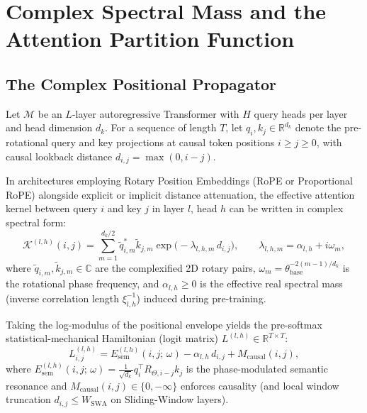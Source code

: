 \documentclass[11pt,letterpaper]{article}
\theoremstyle{definition}
\begin{document}
\tableofcontents
\vspace{1em}

\section{Complex Spectral Mass and the Attention Partition Function}

\subsection{The Complex Positional Propagator}
Let $\mathcal{M}$ be an $L$-layer autoregressive Transformer with $H$ query heads per layer and head dimension $d_k$. For a sequence of length $T$, let $q_i, k_j \in \mathbb{R}^{d_k}$ denote the pre-rotational query and key projections at causal token positions $i \ge j \ge 0$, with causal lookback distance $d_{i,j} = \max(0, i - j)$.

In architectures employing Rotary Position Embeddings (RoPE or Proportional RoPE) alongside explicit or implicit distance attenuation, the effective attention kernel between query $i$ and key $j$ in layer $l$, head $h$ can be written in complex spectral form:
\begin{equation}
    \mathcal{K}^{(l,h)}(i, j) = \sum_{m=1}^{d_k / 2} \tilde{q}_{i,m}^* \tilde{k}_{j,m} \exp\!\big(-\lambda_{l,h,m}\, d_{i,j}\big), \qquad \lambda_{l,h,m} = \alpha_{l,h} + i\omega_m,
    \label{eq:complex_mass}
\end{equation}
where $\tilde{q}_{i,m}, \tilde{k}_{j,m} \in \mathbb{C}$ are the complexified 2D rotary pairs, $\omega_m = \theta_{\text{base}}^{-2(m-1)/d_k}$ is the rotational phase frequency, and $\alpha_{l,h} \ge 0$ is the effective real spectral mass (inverse correlation length $\xi_{l,h}^{-1}$) induced during pre-training.

Taking the log-modulus of the positional envelope yields the pre-softmax statistical-mechanical Hamiltonian (logit matrix) $L^{(l,h)} \in \mathbb{R}^{T \times T}$:
\begin{equation}
    L^{(l,h)}_{i,j} = E_{\text{sem}}^{(l,h)}(i, j;\, \omega) - \alpha_{l,h}\, d_{i,j} + M_{\text{causal}}(i, j),
    \label{eq:hamiltonian}
\end{equation}
where $E_{\text{sem}}^{(l,h)}(i, j;\, \omega) = \frac{1}{\sqrt{d_k}} q_i^\top R_{\Theta, i-j} k_j$ is the phase-modulated semantic resonance and $M_{\text{causal}}(i,j) \in \{0, -\infty\}$ enforces causality (and local window truncation $d_{i,j} \le W_{\text{SWA}}$ on Sliding-Window layers).
\end{document}
